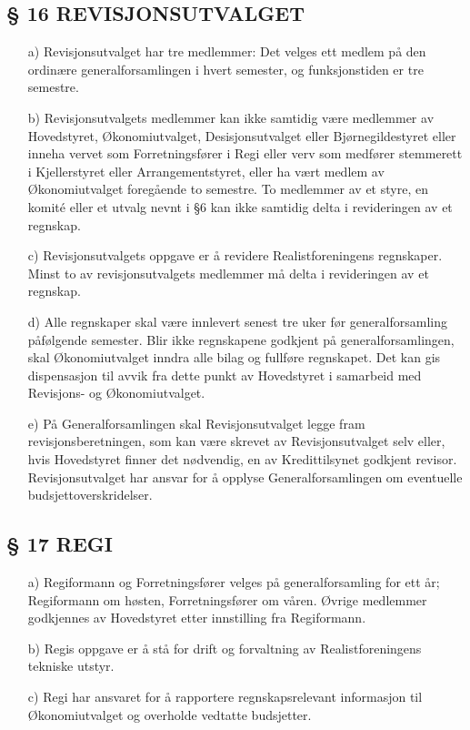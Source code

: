 \subsection*{§ 16 REVISJONSUTVALGET}

\begin{itemize}
\item[a)] Revisjonsutvalget har tre medlemmer: Det velges ett medlem på den ordinære
generalforsamlingen i hvert semester, og funksjonstiden er tre semestre.

\item[b)] Revisjonsutvalgets medlemmer kan ikke samtidig være medlemmer av
Hovedstyret, Økonomiutvalget, Desisjonsutvalget eller Bjørnegildestyret 
eller inneha vervet som Forretningsfører i Regi eller verv som
medfører stemmerett i Kjellerstyret eller Arrangementstyret, eller ha
vært medlem av Økonomiutvalget foregående to semestre. To medlemmer av et 
styre, en komité eller et utvalg nevnt i §6 kan ikke samtidig delta i 
revideringen av et regnskap.

\item[c)] Revisjonsutvalgets oppgave er å revidere Realistforeningens
regnskaper. Minst to av revisjonsutvalgets medlemmer må delta i
revideringen av et regnskap.

\item[d)] Alle regnskaper skal være innlevert senest tre uker før
generalforsamling påfølgende semester. Blir ikke regnskapene godkjent
på generalforsamlingen, skal Økonomiutvalget inndra alle bilag og
fullføre regnskapet. Det kan gis dispensasjon til avvik fra dette
punkt av Hovedstyret i samarbeid med Revisjons- og Økonomiutvalget.

\item[e)] På Generalforsamlingen skal Revisjonsutvalget legge fram
revisjonsberetningen, som kan være skrevet av Revisjonsutvalget selv
eller, hvis Hovedstyret finner det nødvendig, en av Kredittilsynet
godkjent revisor.  Revisjonsutvalget har ansvar for å opplyse
Generalforsamlingen om eventuelle budsjettoverskridelser.
\end{itemize}


\subsection*{§ 17 REGI}

\begin{itemize}
\item[a)] Regiformann og Forretningsfører velges på generalforsamling for ett
år; Regiformann om høsten, Forretningsfører om våren.  Øvrige
medlemmer godkjennes av Hovedstyret etter innstilling fra Regiformann.

\item[b)] Regis oppgave er å stå for drift og forvaltning av
Realistforeningens tekniske utstyr.

\item[c)] Regi har ansvaret for å rapportere regnskapsrelevant
  informasjon til Økonomiutvalget og overholde vedtatte budsjetter.
\end{itemize}


